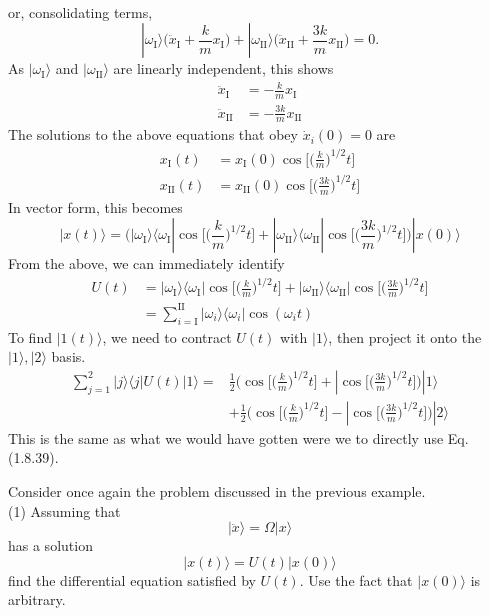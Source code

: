 \documentclass[../principles-of-quantum-mechanics.tex]{subfiles}
\begin{document}
\begin{questions}
\begin{solution}
\begin{align*}
	\end{align*}
	or, consolidating terms,
	\[
		|\omega_{\mathrm{I}}\rangle\Big(\ddot{x}_{\mathrm{I}} + \frac{k}{m}x_{\mathrm{I}}\Big) + |\omega_{\mathrm{II}}\rangle\Big(\ddot{x}_{\mathrm{II}} + \frac{3k}{m}x_{\mathrm{II}}\Big) = 0.
	\]
	As $|\omega_{\mathrm{I}}\rangle$ and $|\omega_{\mathrm{II}}\rangle$ are linearly independent, this shows
	\begin{align*}
		\ddot{x}_{\mathrm{I}} &= {-\frac{k}{m}}x_{\mathrm{I}} \\
		\ddot{x}_{\mathrm{II}} &= {-\frac{3k}{m}}x_{\mathrm{II}}
	\end{align*}
	The solutions to the above equations that obey $\dot{x}_i(0)=0$ are
	\begin{align*}
		x_{\mathrm{I}}(t) &= x_{\mathrm{I}}(0)\cos\Big[\Big(\frac{k}{m}\Big)^{1/2}t\Big] \\
		x_{\mathrm{II}}(t) &= x_{\mathrm{II}}(0)\cos\Big[\Big(\frac{3k}{m}\Big)^{1/2}t\Big]
	\end{align*}
	In vector form, this becomes
	\[
		|x(t)\rangle = \Big(|\omega_{\mathrm{I}}\rangle\langle\omega_{\mathrm{I}}|\cos\Big[\Big(\frac{k}{m}\Big)^{1/2}t\Big] + |\omega_{\mathrm{II}}\rangle\langle\omega_{\mathrm{II}}|\cos\Big[\Big(\frac{3k}{m}\Big)^{1/2}t\Big]\Big)|x(0)\rangle
	\]
	From the above, we can immediately identify
	\begin{align*}
		U(t) &= |\omega_{\mathrm{I}}\rangle\langle\omega_{\mathrm{I}}|\cos\Big[\Big(\frac{k}{m}\Big)^{1/2}t\Big] + |\omega_{\mathrm{II}}\rangle\langle\omega_{\mathrm{II}}|\cos\Big[\Big(\frac{3k}{m}\Big)^{1/2}t\Big] \\
		&= \sum_{i=\mathrm{I}}^{\mathrm{II}}|\omega_i\rangle\langle\omega_i|\cos(\omega_it)
	\end{align*}
	To find $|1(t)\rangle$, we need to contract $U(t)$ with $|1\rangle$, then project it onto the $|1\rangle, |2\rangle$ basis.
	\begin{align*}
		\sum_{j=1}^2|j\rangle\langle{j}|U(t)|1\rangle = &\frac{1}{2}\Big(\cos\Big[\Big(\frac{k}{m}\Big)^{1/2}t\Big] + |\cos\Big[\Big(\frac{3k}{m}\Big)^{1/2}t\Big]\Big)|1\rangle \\
		&+ \frac{1}{2}\Big(\cos\Big[\Big(\frac{k}{m}\Big)^{1/2}t\Big] - |\cos\Big[\Big(\frac{3k}{m}\Big)^{1/2}t\Big]\Big)|2\rangle
	\end{align*}
	This is the same as what we would have gotten were we to directly use Eq. (1.8.39).
\end{solution}

\question Consider once again the problem discussed in the previous example. \\
(1) Assuming that
\[
	|\ddot{x}\rangle = \Omega|x\rangle
\]
has a solution
\[
	|x(t)\rangle = U(t)|x(0)\rangle
\]
find the differential equation satisfied by $U(t)$. Use the fact that $|x(0)\rangle$ is arbitrary.


\end{questions}
\end{document}
